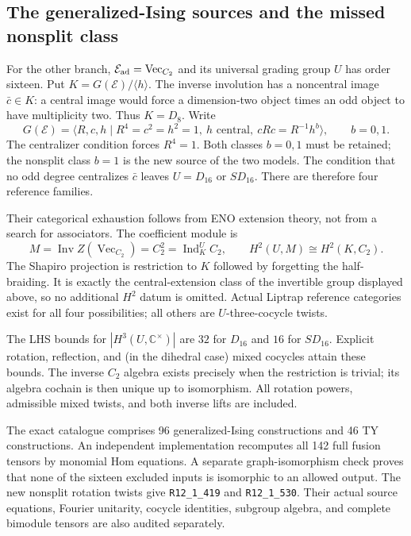\documentclass[11pt]{article}
\newcommand{\R}[1]{\texttt{R12\_1\_#1}}
\renewcommand{\Vec}{\operatorname{Vec}}
\newcommand{\C}{\mathbb C}
\begin{document}
\subsection{The generalized-Ising sources and the missed nonsplit class}
For the other branch, $\mathcal E_{\rm ad}=\Vec_{C_2}$ and its universal
grading group $U$ has order sixteen. Put $K=G(\mathcal E)/\langle h\rangle$.
The inverse involution has a noncentral image $\bar c\in K$: a central
image would force a dimension-two object times an odd object to have
multiplicity two. Thus $K=D_8$. Write
\[
 G(\mathcal E)=\langle R,c,h\mid R^4=c^2=h^2=1,\ h\text{ central},
 \ cRc=R^{-1}h^b\rangle,\qquad b=0,1.
\]
The centralizer condition forces $R^4=1$. Both classes $b=0,1$ must be
retained; the nonsplit class $b=1$ is the new source of the two models.
The condition that no odd degree centralizes $\bar c$ leaves
$U=D_{16}$ or $SD_{16}$. There are therefore four reference families.

Their categorical exhaustion follows from ENO extension theory, not from
a search for associators. The coefficient module is
\[
 M=\operatorname{Inv}Z(\Vec_{C_2})=C_2^2
   =\operatorname{Ind}_K^U C_2,
 \qquad H^2(U,M)\cong H^2(K,C_2).
\]
The Shapiro projection is restriction to $K$ followed by forgetting the
half-braiding. It is exactly the central-extension class of the invertible
group displayed above, so no additional $H^2$ datum is omitted. Actual
Liptrap reference categories exist for all four possibilities; all others
are $U$-three-cocycle twists.

The LHS bounds for $|H^3(U,\C^\times)|$ are $32$ for $D_{16}$ and $16$
for $SD_{16}$. Explicit rotation, reflection, and (in the dihedral case)
mixed cocycles attain these bounds. The inverse $C_2$ algebra exists
precisely when the restriction is trivial; its algebra cochain is then
unique up to isomorphism. All rotation powers, admissible mixed twists,
and both inverse lifts are included.

The exact catalogue comprises 96 generalized-Ising constructions and 46
TY constructions. An independent implementation recomputes all 142 full
fusion tensors by monomial Hom equations. A separate graph-isomorphism
check proves that none of the sixteen excluded inputs is isomorphic to
an allowed output. The new nonsplit rotation twists give \R{419} and
\R{530}. Their actual source equations, Fourier unitarity, cocycle
identities, subgroup algebra, and complete bimodule tensors are also
audited separately.
\end{document}
